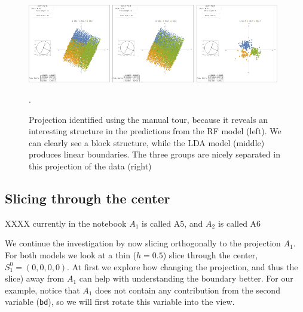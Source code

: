 \documentclass[]{interact}
\theoremstyle{plain}%
\theoremstyle{definition}
\theoremstyle{remark}
\begin{document}
\begin{figure}[ht]
\centerline{\includegraphics[width=0.32\textwidth]{figures/proj1_rf.png}
\includegraphics[width=0.32\textwidth]{figures/proj1_lda.png}
\includegraphics[width=0.32\textwidth]{figures/proj1_data.png}}
\caption{Projection identified using the manual tour, because it reveals an interesting structure in the predictions from the RF model (left). We can clearly see a block structure, while the LDA model (middle) produces linear boundaries. The three groups are nicely separated in this projection of the data (right)}.
\label{proj1}
\end{figure}

\hypertarget{slicing-through-the-center}{%
\subsection{Slicing through the
center}\label{slicing-through-the-center}}

XXXX currently in the notebook \(A_1\) is called A5, and \(A_2\) is
called A6

We continue the investigation by now slicing orthogonally to the
projection \(A_1\). For both models we look at a thin (\(h=0.5\)) slice
through the center, \(S_1^0 = (0,0,0,0)\). At first we explore how
changing the projection, and thus the slice) away from \(A_1\) can help
with understanding the boundary better. For our example, notice that
\(A_1\) does not contain any contribution from the second variable
(\texttt{bd}), so we will first rotate this variable into the view.
\end{document}
